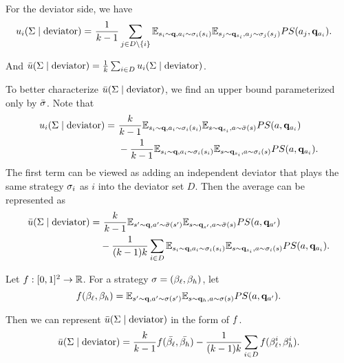 For the deviator side, we have 
\begin{align*}
    u_i(\Sigma \mid \text{deviator}) =&\  \frac{1}{k-1}\sum_{j \in D\setminus\{i\}} \mathbb{E}_{s_i \sim \mathbf{q}
    , a_i \sim \sigma_i(s_i)} \mathbb{E}_{s_j \sim \mathbf{q}_{s_i}, a_j \sim \sigma_j(s_j)} PS(a_j, \mathbf{q}_{a_i}).
\end{align*}

And $\bar{u}(\Sigma\mid \text{deviator}) = \frac{1}{k} \sum_{i\in D} u_i(\Sigma\mid \text{deviator})$. 

To better characterize $\bar{u}(\Sigma\mid \text{deviator})$, we find an upper bound parameterized only by $\bar{\sigma}$. Note that
\begin{align*}
    u_i(\Sigma \mid \text{deviator}) =&\  \frac{k}{k-1} \mathbb{E}_{s_i \sim \mathbf{q}
    , a_i \sim \sigma_i(s_i)} \mathbb{E}_{s \sim \mathbf{q}_{s_i}, a \sim \bar{\sigma}(s)} PS(a, \mathbf{q}_{a_i}) \\
    &\ - \frac{1}{k - 1} \mathbb{E}_{s_i \sim \mathbf{q}
    , a_i \sim \sigma_i(s_i)} \mathbb{E}_{s \sim \mathbf{q}_{s_i}, a \sim \sigma_i(s)} PS(a, \mathbf{q}_{a_i}).
\end{align*}
The first term can be viewed as adding an independent deviator that plays the same strategy $\sigma_i$ as $i$ into the deviator set $D$. Then the average can be represented as 
\begin{align*}
    \bar{u}(\Sigma\mid \text{deviator}) = &\ \frac{k}{k - 1} \mathbb{E}_{s' \sim \mathbf{q}
    , a' \sim \bar{\sigma}(s')} \mathbb{E}_{s \sim \mathbf{q}_{s'}, a \sim \bar{\sigma}(s)} PS(a, \mathbf{q}_{a'})\\
    & - \frac{1}{(k - 1)k} \sum_{i \in D} \mathbb{E}_{s_i \sim \mathbf{q}
    , a_i \sim \sigma_i(s_i)} \mathbb{E}_{s \sim \mathbf{q}_{s_i}, a \sim \sigma_i(s)} PS(a, \mathbf{q}_{a_i}).
\end{align*}

Let $f: [0, 1]^2 \to \mathbb{R}$. For a strategy $\sigma = (\beta_{\ell}, \beta_{h})$, let
\begin{equation*}
    f(\beta_{\ell}, \beta_{h}) = \mathbb{E}_{s' \sim \mathbf{q}
    , a' \sim \sigma(s')} \mathbb{E}_{s \sim \mathbf{q}_{h}, a \sim \sigma(s)} PS(a, \mathbf{q}_{a'}). 
\end{equation*}

Then we can represent $ \bar{u}(\Sigma\mid \text{deviator})$ in the form of $f$. 
\begin{equation*}
     \bar{u}(\Sigma\mid \text{deviator}) = \frac{k}{k-1} f(\bar{\beta_{\ell}}, \bar{\beta_{h}}) - \frac{1}{(k-1)k} \sum_{i\in D} f(\beta_{\ell}^i, \beta_{h}^i). 
\end{equation*}

